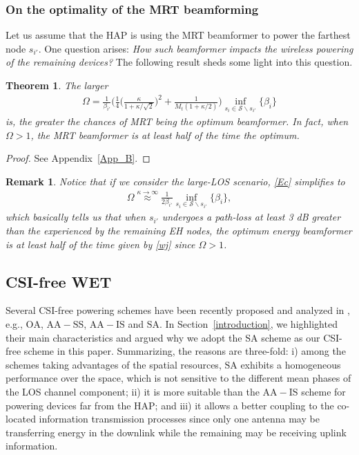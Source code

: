 \documentclass[10pt,journal,a4paper]{IEEEtran}
\newtheorem{theorem}{Theorem}
\newtheorem{remark}{Remark}
\begin{document}
	\subsubsection{On the optimality of the MRT beamforming}\label{users}
	Let us assume that the HAP is using the MRT beamformer to power the farthest node $s_{i'}$. One question arises: \textit{How such beamformer impacts the wireless powering of the remaining devices?} The following result sheds some light into this question.	
	\begin{theorem}\label{the3}
		The larger
		\begin{align}
		\Omega=\frac{1}{\beta_{i'}}\bigg(\frac{1}{4}\Big(\frac{\kappa}{1\!+\!\kappa/\sqrt{2}}\Big)^2\!+\!\frac{1}{M_t(1\!+\!\kappa/2)}\bigg)\!\inf_{s_i\in\mathcal{S}\backslash s_{i'}}\!\{\beta_i\}\label{Ec}
		\end{align}
		is, the greater the chances of MRT being the optimum beamformer. In fact, when $\Omega>1$, the MRT beamformer is at least half of the time the optimum.		
	\end{theorem}
%
\begin{proof}
	See Appendix~\ref{App_B}.  \phantom\qedhere
\end{proof}
%
\begin{remark}\label{re3}
	Notice that if we consider the large-LOS scenario, \eqref{Ec} simplifies to 
	\begin{align}
	\Omega
	\stackrel{\kappa\rightarrow\infty}{\approx}\frac{1}{2\beta_{i'}}\inf_{s_i\in\mathcal{S}\backslash s_{i'}}\{\beta_i\},
	\end{align}
	which basically tells us that when $s_{i'}$ undergoes a path-loss at least 3 dB greater than the experienced by the remaining EH nodes, the optimum energy beamformer is at least half of the time given by \eqref{wj} since $\Omega>1$. 
\end{remark}
%
	\subsection{CSI-free WET}\label{free}
	Several CSI-free powering schemes have been recently proposed and analyzed in \cite{Lopez.2019_CSI,Lopez.2020}, e.g., $\mathrm{OA}$, $\mathrm{AA-SS}$, $\mathrm{AA-IS}$ and $\mathrm{SA}$. In Section~\ref{introduction}, we highlighted their main characteristics and argued why we adopt the $\mathrm{SA}$ scheme as our CSI-free scheme in this paper. Summarizing, the reasons are three-fold: i) among the schemes taking advantages of the spatial resources, $\mathrm{SA}$ exhibits a homogeneous performance over the space, which is not sensitive to the different mean phases of the LOS channel component; ii) it is more suitable than the $\mathrm{AA-IS}$ scheme for powering devices far from the HAP; and iii) it allows a better coupling to the co-located information transmission processes since only one antenna may be transferring energy in the downlink while the remaining may be receiving uplink information.
	
\end{document}
